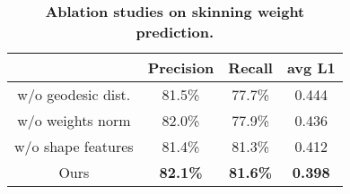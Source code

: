 \begin{table}[]
  \caption{\textbf{Ablation studies on skinning weight prediction.}}
  \label{ab_skin}
  \centering
  \begin{tabular}{cccc}
    \toprule
      &  Precision  &Recall & avg L1  \\
    \midrule
    w/o geodesic dist.  & 81.5\% & 77.7\% & 0.444 \\
    w/o weights norm   & 82.0\% & 77.9\%  & 0.436 \\
     w/o shape features   & 81.4\% &
81.3\% &
0.412 \\
    Ours      & \textbf{82.1{\%}} & \textbf{81.6{\%}} & \textbf{0.398}  
    \\
    \bottomrule
  \end{tabular}
  \vspace{-15pt}
\end{table}
